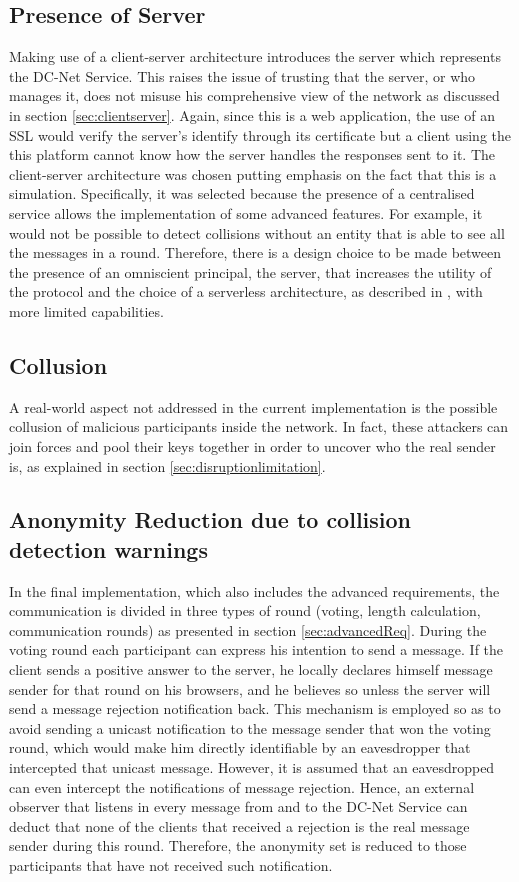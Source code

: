 \subsection{Presence of Server} \label{sec:evalServerPresence}
Making use of a client-server architecture introduces the server which represents the DC-Net Service. This raises the issue of trusting that the server, or who manages it, does not misuse his comprehensive view of the network as discussed in section \ref{sec:clientserver}. Again, since this is a web application, the use of an SSL would verify the server's identify through its certificate but a client using the this platform cannot know how the server handles the responses sent to it. The client-server architecture was chosen putting emphasis on the fact that this is a simulation. Specifically, it was selected because the presence of a centralised service allows the implementation of some advanced features. For example, it would not be possible to detect collisions without an entity that is able to see all the messages in a round. Therefore, there is a design choice to be made between the presence of an omniscient principal, the server, that increases the utility of the protocol and the choice of a serverless architecture, as described in \cite{Scholz}, with more limited capabilities.

\subsection{Collusion}
A real-world aspect not addressed in the current implementation is the possible collusion of malicious participants inside the network. In fact, these attackers can join forces and pool their keys together in order to uncover who the real sender is, as explained in section \ref{sec:disruptionlimitation}.

\subsection{Anonymity Reduction due to collision detection warnings} \label{sec:anonymityReductionLimitation}
In the final implementation, which also includes the advanced requirements, the communication is divided in three types of round (voting, length calculation, communication rounds) as presented in section \ref{sec:advancedReq}. During the voting round each participant can express his intention to send a message. If the client sends a positive answer to the server, he locally declares himself message sender for that round on his browsers, and he believes so unless the server will send a message rejection notification back. This mechanism is employed so as to avoid sending a unicast notification to the message sender that won the voting round, which would make him directly identifiable by an eavesdropper that intercepted that unicast message. However, it is assumed that an eavesdropped can even intercept the notifications of message rejection. Hence, an external observer that listens in every message from and to the DC-Net Service can deduct that none of the clients that received a rejection is the real message sender during this round. Therefore, the anonymity set is reduced to those participants that have not received such notification.

